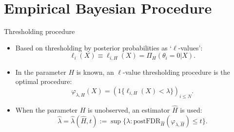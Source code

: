 \documentclass[10pt, aspectratio=169]{beamer}
\begin{document}
\section[Empirical approach]{Empirical Bayesian Procedure}

\begin{frame}{Thresholding procedure}
    
    \begin{itemize}[label=\scalebox{0.5}{$\bullet$}]
        \item Based on thresholding by posterior probabilities as ‘$\ell$-values’:
        \begin{equation}
            \ell_i(X) \equiv \ell_{i,H}(X) = \Pi_H(\theta_i = 0 | X). \tag{7}
        \end{equation}
        
        \item In the parameter \( H \) is known, an $\ell$-value thresholding procedure is the optimal procedure:
        \begin{equation}
            \varphi_{\lambda,H}(X) = \left(1\{\ell_{i,H}(X) < \lambda\}\right)_{i \leq N}. \tag{8}
        \end{equation}
        
        \item When the parameter \( H \) is unobserved, an estimator \( \hat{H} \) is used:
        \begin{equation}
             \hat{\lambda} = \hat{\lambda}(\hat{H},t) := \sup\{\lambda : \text{postFDR}_{\hat{H}}(\varphi_{\lambda,\hat{H}}) \leq t\}. \tag{9}
        \end{equation}
    \end{itemize}
    
\end{frame}
\end{document}
